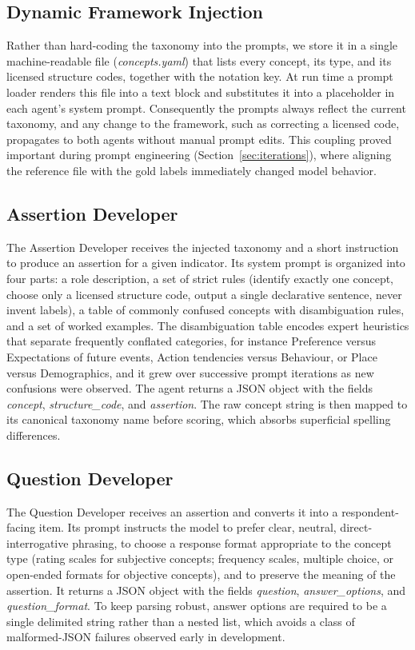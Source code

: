 \documentclass[onecolumn, 11pt]{IEEEtran}
\begin{document}
\subsection{Dynamic Framework Injection}
Rather than hard-coding the taxonomy into the prompts, we store it in a single machine-readable file (\emph{concepts.yaml}) that lists every concept, its type, and its licensed structure codes, together with the notation key. At run time a prompt loader renders this file into a text block and substitutes it into a placeholder in each agent's system prompt. Consequently the prompts always reflect the current taxonomy, and any change to the framework, such as correcting a licensed code, propagates to both agents without manual prompt edits. This coupling proved important during prompt engineering (Section~\ref{sec:iterations}), where aligning the reference file with the gold labels immediately changed model behavior.

\subsection{Assertion Developer}
The Assertion Developer receives the injected taxonomy and a short instruction to produce an assertion for a given indicator. Its system prompt is organized into four parts: a role description, a set of strict rules (identify exactly one concept, choose only a licensed structure code, output a single declarative sentence, never invent labels), a table of commonly confused concepts with disambiguation rules, and a set of worked examples. The disambiguation table encodes expert heuristics that separate frequently conflated categories, for instance Preference versus Expectations of future events, Action tendencies versus Behaviour, or Place versus Demographics, and it grew over successive prompt iterations as new confusions were observed. The agent returns a JSON object with the fields \emph{concept}, \emph{structure\_code}, and \emph{assertion}. The raw concept string is then mapped to its canonical taxonomy name before scoring, which absorbs superficial spelling differences.

\subsection{Question Developer}
The Question Developer receives an assertion and converts it into a respondent-facing item. Its prompt instructs the model to prefer clear, neutral, direct-interrogative phrasing, to choose a response format appropriate to the concept type (rating scales for subjective concepts; frequency scales, multiple choice, or open-ended formats for objective concepts), and to preserve the meaning of the assertion. It returns a JSON object with the fields \emph{question}, \emph{answer\_options}, and \emph{question\_format}. To keep parsing robust, answer options are required to be a single delimited string rather than a nested list, which avoids a class of malformed-JSON failures observed early in development.
\end{document}

